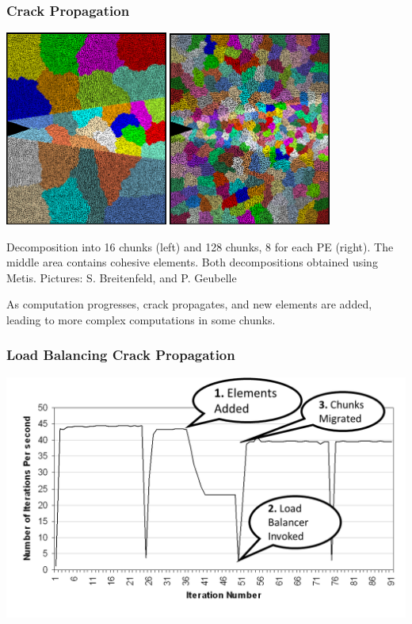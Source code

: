 \begin{frame}[fragile]
\frametitle{Crack Propagation}
\begin{centering}
\includegraphics[width=0.4\textwidth]{figures/chunkGraph16}
\includegraphics[width=0.4\textwidth]{figures/chunkGraph128}
\end{centering}
Decomposition into 16 chunks (left) and 128 chunks, 8 for each PE (right). The middle area contains cohesive elements. Both decompositions obtained using Metis. Pictures: S. Breitenfeld, and P. Geubelle

As computation progresses, crack propagates, and new elements are added, leading to more complex computations in some chunks.
\end{frame}

\begin{frame}[fragile]
\frametitle{Load Balancing Crack Propagation}
\begin{centering}
\includegraphics[width=1.0\textwidth]{figures/LButilizationCrackPropWithAnnotation}
\end{centering}
\end{frame}


